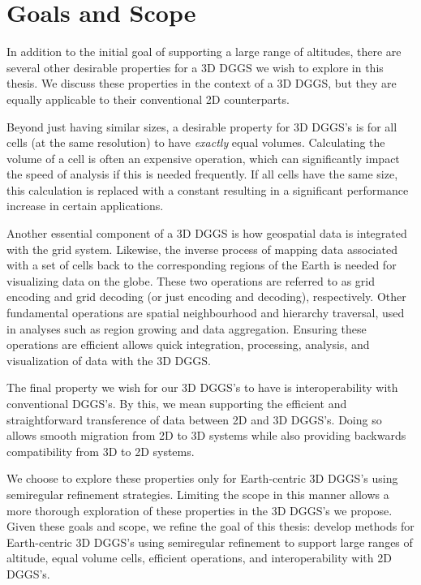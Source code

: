 \section{Goals and Scope}
In addition to the initial goal of supporting a large range of altitudes, there are several other desirable properties for a 3D DGGS we wish to explore in this thesis.
We discuss these properties in the context of a 3D DGGS, but they are equally applicable to their conventional 2D counterparts.


Beyond just having similar sizes, a desirable property for 3D DGGS's is for all cells (at the same resolution) to have \textit{exactly} equal volumes.
Calculating the volume of a cell is often an expensive operation, which can significantly impact the speed of analysis if this is needed frequently.
If all cells have the same size, this calculation is replaced with a constant resulting in a significant performance increase in certain applications.


Another essential component of a 3D DGGS is how geospatial data is integrated with the grid system.
Likewise, the inverse process of mapping data associated with a set of cells back to the corresponding regions of the Earth is needed for visualizing data on the globe.
These two operations are referred to as grid encoding and grid decoding (or just encoding and decoding), respectively.
Other fundamental operations are spatial neighbourhood and hierarchy traversal, used in analyses such as region growing and data aggregation.
Ensuring these operations are efficient allows quick integration, processing, analysis, and visualization of data with the 3D DGGS.


The final property we wish for our 3D DGGS's to have is interoperability with conventional DGGS's.
By this, we mean supporting the efficient and straightforward transference of data between 2D and 3D DGGS's.
Doing so allows smooth migration from 2D to 3D systems while also providing backwards compatibility from 3D to 2D systems.


We choose to explore these properties only for Earth-centric 3D DGGS's using semiregular refinement strategies.
Limiting the scope in this manner allows a more thorough exploration of these properties in the 3D DGGS's we propose.
Given these goals and scope, we refine the goal of this thesis: develop methods for Earth-centric 3D DGGS's using semiregular refinement to support large ranges of altitude, equal volume cells, efficient operations, and interoperability with 2D DGGS's.


